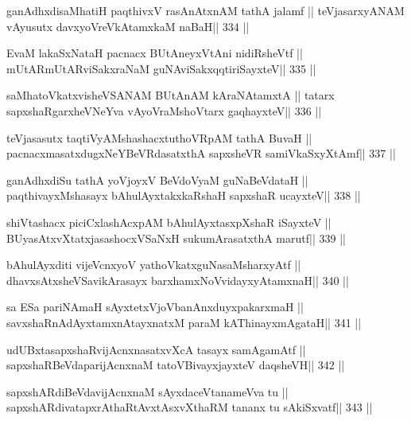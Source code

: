 \begin{shl}
ganAdhxdisaMhatiH paqthivxV rasAnAtxnAM tathA jalamf ||
teVjasarxyANAM vAyusutx davxyoVreVkAtamxkaM naBaH\hfill || 334 ||
\end{shl}

\begin{shl}
EvaM lakaSxNataH pacnacx BUtAneyxVtAni nidiRsheVtf ||
mUtARmUtARviSakxraNaM guNAviSakxqqtiriSayxteV\hfill || 335 ||
\end{shl}

\begin{shl}
saMhatoVkatxvisheVSANAM BUtAnAM kAraNAtamxtA ||
tatarx sapxshaRgarxheVNeYva vAyoVraMshoV\s tarx gaqhayxteV\hfill || 336 ||
\end{shl}

\begin{shl}
teVjasasutx taqtiVyAMshashacxtuthoVR\s pAM tathA BuvaH ||
pacnacxmasatxdugxNeYBeVRdasatxthA sapxsheVR samiVkaSxyXtAmf\hfill || 337 ||
\end{shl}

\begin{shl}
ganAdhxdiSu tathA yoVjoyxV BeVdoV\s yaM guNaBeVdataH ||
paqthivayxMshasayx bAhulAyxtakxkaRshaH sapxshaR ucayxteV\hfill || 338 ||
\end{shl}

\begin{shl}
shiVtashacx piciCxlashAcxpAM bAhulAyxtasxpXshaR iSayxteV ||
BUyasAtxvXtatxjasashocxVSaNxH sukumArasatxthA marutf\hfill || 339 ||
\end{shl}

\begin{shl}
bAhulAyxditi vijeVcnxyoV yathoVkatxguNasaMsharxyAtf ||
dhavxsAtxsheVSavikArasayx barxhamxNoV\s vidayxyA\s\s tamxnaH\hfill || 340 ||
\end{shl}

\begin{shl}
sa ESa pariNAmaH sAyxtetxVjoVbanAnxduyxpakarxmaH ||
savxshaRnAdAyxtamxnA\s tayxnatxM paraM kAThinayxmAgataH\hfill || 341 ||
\end{shl}

\begin{shl}
udUBxtasapxshaRvijAcnxnasatxvXcA tasayx samAgamAtf ||
sapxshaRBeVdaparijAcnxnaM tatoV\s BivayxjayxteV daqsheVH\hfill || 342 ||
\end{shl}

\begin{shl}
sapxshARdiBeVdavijAcnxnaM sAyxdaceVtanameVva tu ||
sapxshARdivatapxrAthaRtAvxtAsxvXthaRM tananx tu sAkiSxvatf\hfill || 343 ||
\end{shl}

